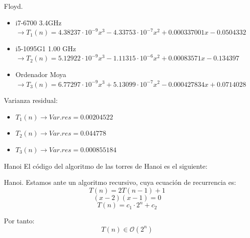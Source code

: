 \documentclass[10pt, xcolor=table]{beamer}
\begin{document}
\begin{frame}[fragile]{Floyd.
}
\begin{itemize}
	\item i7-6700 3.4GHz \(\rightarrow T_1(n) = 4.38237 \cdot 10^{-9} x^3 - 4.33753 \cdot 10^{-7} x^2 + 0.000337001x - 0.0504332\)
	\item i5-1095G1 1.00 GHz \(\rightarrow T_2(n) = 5.12922 \cdot 10^{-9} x^3 - 1.11315 \cdot 10^{-6} x^2 + 0.00083571x - 0.134397\)
	\item Ordenador Moya \(\rightarrow T_3(n) = 6.77297 \cdot 10^{-9} x^3 + 5.13099 \cdot 10^{-7} x^2 - 0.000427834 x + 0.0714028\)
\end{itemize}

Varianza residual:
\begin{itemize}
	\item \(T_1 (n) \longrightarrow Var.res = 0.00204522\)
	\item \(T_2 (n) \longrightarrow Var.res = 0.044778\)
	\item \(T_3 (n) \longrightarrow Var.res = 0.000855184\)
\end{itemize}
\end{frame}

\begin{frame}{Hanoi}
El código del algoritmo de las torres de Hanoi es el siguiente:

\end{frame}

\begin{frame}[fragile]{Hanoi.
}
Estamos ante un algoritmo recursivo, cuya ecuación de recurrencia es:
\[
	T(n) = 2 T(n-1) +1
\]
\[
	(x-2)(x-1) = 0
\]
\[
	T(n) = c_1 \cdot 2^n + c_2
\]

Por tanto:
\[
	T(n) \in \mathcal{O}(2^n)
\]
\end{frame}
\end{document}
